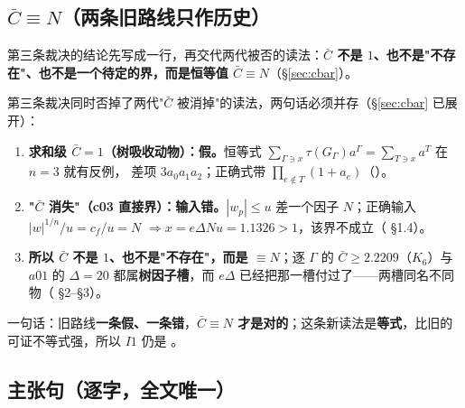 \subsection{$\bar C\equiv N$（两条旧路线只作历史）}\label{sec:cbar-why}

第三条裁决的结论先写成一行，再交代两代被否的读法：\textbf{$\bar C$ 不是 $1$、也不是"不存在"、也不是一个待定的界，而是恒等值 $\bar C\equiv N$}（\S\ref{sec:cbar}）。

第三条裁决同时否掉了两代"$\bar C$ 被消掉"的读法，两句话必须并存（\S\ref{sec:cbar} 已展开）：
\begin{enumerate}[label=(\arabic*)]
\item \textbf{求和级 $\bar C=1$（树吸收动物）：假。}恒等式 $\sum_{\Gamma\ni x}\tau(G_\Gamma)a^\Gamma=\sum_{T\ni x}a^T$ 在 $n=3$ 就有反例，
差项 $3a_0a_1a_2$；正确式带 $\prod_{e\notin T}(1+a_e)$（）。
\item \textbf{"$\bar C$ 消失"（c03 直接界）：输入错。}$|w_p|\le u$ 差一个因子 $N$；正确输入 $|w|^{1/n}/u=c_f/u=N$
$\Rightarrow x=e\Delta Nu=1.1326>1$，该界不成立（ \S1.4）。
\item \textbf{所以 $\bar C$ 不是 $1$、也不是"不存在"，而是 $\equiv N$}；逐 $\Gamma$ 的 $\bar C\ge2.2209$（$K_6$）与 $a01$ 的 $\Delta=20$
都属\textbf{树因子槽}，而 $e\Delta$ 已经把那一槽付过了——两槽同名不同物（ \S2--\S3）。
\end{enumerate}
一句话：旧路线\textbf{一条假、一条错}，\textbf{$\bar C\equiv N$ 才是对的}；这条新读法是\textbf{等式}，比旧的可证不等式强，所以 $I1$ 仍是 \LT。

\subsection{主张句（逐字，全文唯一）}

